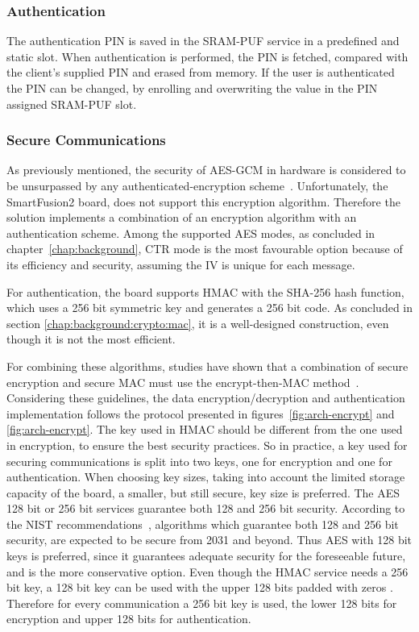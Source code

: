 \subsubsection*{Authentication}

The authentication PIN is saved in the SRAM-PUF service in a predefined and static slot. When authentication is performed, the PIN is fetched, compared with the client's supplied PIN and erased from memory.
If the user is authenticated the PIN can be changed, by enrolling and overwriting the value in the PIN assigned SRAM-PUF slot.

\subsubsection*{Secure Communications}

As previously mentioned, the security of \ac{AES}-\ac{GCM} in hardware is considered to be unsurpassed by any authenticated-encryption scheme~\cite{aesmodes}.
Unfortunately, the SmartFusion2 board, does not support this encryption algorithm.
Therefore the solution implements a combination of an encryption algorithm with an authentication scheme. Among the supported \ac{AES} modes, as concluded in chapter~\ref{chap:background}, CTR mode is the most favourable option because of its efficiency and security, assuming the IV is unique for each message.

For authentication, the board supports \ac{HMAC} with the \ac{SHA}-256 hash function, which uses a 256 bit symmetric key and generates a 256 bit code. As concluded in section \ref{chap:background:crypto:mac}, it is a well-designed construction, even though it is not the most efficient.

For combining these algorithms, studies have shown that a combination of secure encryption and secure \ac{MAC} must use the encrypt-then-MAC method~\cite{encryptmacorder}.
Considering these guidelines, the data encryption/decryption and authentication implementation follows the protocol presented in figures~\ref{fig:arch-encrypt} and \ref{fig:arch-encrypt}.
The key used in HMAC should be different from the one used in encryption, to ensure the best security practices. So in practice, a key used for securing communications is split into two keys, one for encryption and one for authentication.
When choosing key sizes, taking into account the limited storage capacity of the board, a smaller, but still secure, key size is preferred. The \ac{AES} 128 bit or 256 bit services guarantee both 128 and 256 bit security. According to the \ac{NIST} recommendations~\cite{nistRecommendations}, algorithms which guarantee both 128 and 256 bit security, are expected to be secure from 2031 and beyond. Thus \ac{AES} with 128 bit keys is preferred, since it guarantees adequate security for the foreseeable future, and is the more conservative option.
Even though the HMAC service needs a 256 bit key, a 128 bit key can be used with the upper 128 bits padded with zeros \cite{smartfusionSecurityPractices}.
Therefore for every communication a 256 bit key is used, the lower 128 bits for encryption and upper 128 bits for authentication.

